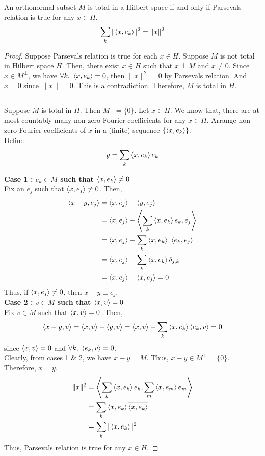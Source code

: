 \begin{theorem}
	An orthonormal subset $M$ is total in a Hilbert space if and only if Parsevals relation is true for any $x \in H$.
	\[ \sum_k |\left\langle x,e_k \right\rangle|^2 = \|x\|^2 \]
\end{theorem}
\begin{proof}
	Suppose Parsevals relation is true for each $x \in H$.
	Suppose $M$ is not total in Hilbert space $H$.
	Then, there exist $x \in H$ such that $x \perp M$ and $x \ne 0$.
	Since $x \in M^\perp$, we have $\forall k,\ \left\langle x,e_k \right\rangle = 0$, then $\|x\|^2 = 0$ by Parsevals relation.
	And $x = 0$ since $\|x\| = 0$.
	This is a contradiction.
	Therefore, $M$ is total in $H$.\\

	\hrule \vspace{1em}
	
	Suppose $M$ is total in $H$.
	Then $M^\perp = \{ 0 \}$.
	Let $x \in H$.
	We know that, there are at most countably many non-zero Fourier coefficients for any $x \in H$.
	Arrange non-zero Fourier coefficients of $x$ in a (finite) sequence $\left\{\left\langle x,e_k \right\rangle\right\}$.\\

	Define
	\[ y = \sum_k \left\langle x,e_k \right\rangle e_k \]

	\textbf{Case 1 : $e_k \in M$ such that $\left\langle x,e_k \right\rangle \ne 0$}\\
	Fix an $e_j$ such that $\left\langle x,e_j \right\rangle \ne 0$.
	Then,
	\begin{align*}
		\inner{x-y}{e_j} 
		& = \inner{x}{e_j} - \inner{y}{e_j} \\
		& = \inner{x}{e_j} - \inner{\sum_k \inner{x}{e_k}e_k}{e_j} \\
		& = \inner{x}{e_j} - \sum_k \inner{x}{e_k} \ \inner{e_k}{e_j} \\
		& = \inner{x}{e_j} - \sum_k \inner{x}{e_k} \delta_{j,k} \\
		& = \inner{x}{e_j} - \inner{x}{e_j} = 0
	\end{align*}
	Thus, if $\left\langle x,e_j \right\rangle \ne 0$, then $x-y \perp e_j$.\\

	\textbf{Case 2 : $v \in M$ such that $\left\langle x,v \right\rangle = 0$}\\
	Fix $v \in M$ such that $\left\langle x,v \right\rangle = 0$.
	Then, 
	\[ \left\langle x-y,v \right\rangle = \left\langle x,v \right\rangle - \left\langle y,v \right\rangle = \left\langle x,v \right\rangle - \sum_k \left\langle x,e_k \right\rangle \left\langle e_k,v \right\rangle = 0 \]
	since $\left\langle x,v \right\rangle = 0$ and $\forall k,\ \left\langle e_k,v \right\rangle = 0$.\\

	Clearly, from cases 1 \& 2, we have $x-y \perp M$.
	Thus, $x - y \in M^\perp = \{ 0 \}$.
	Therefore, $x = y$.
	\begin{align*}
		\|x\|^2
		& = \left\langle \sum_k \left\langle x,e_k \right\rangle e_k,\sum_m \left\langle x,e_m \right\rangle e_m \right\rangle  \\
		& = \sum_k \left\langle x,e_k \right\rangle \overline{\left\langle x,e_k \right\rangle} \\
		& = \sum_k |\left\langle x,e_k \right\rangle|^2
	\end{align*}
	Thus, Parsevals relation is true for any $x \in H$.
\end{proof}


